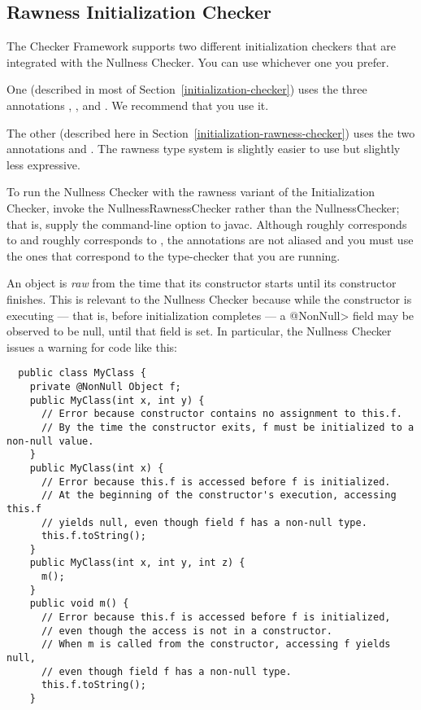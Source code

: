 \subsection{Rawness Initialization Checker\label{initialization-rawness-checker}}

The Checker Framework supports two different initialization checkers that
are integrated with the Nullness Checker.
You can use whichever one you prefer.

One (described in most of Section~\ref{initialization-checker}) uses the three annotations 
,
, and
.
We recommend that you use it.

The other (described here in Section~\ref{initialization-rawness-checker})
uses the two annotations
 and
.
The rawness type system is slightly easier to use but slightly less
expressive.

To run the Nullness Checker with the rawness variant of the Initialization
Checker, invoke the NullnessRawnessChecker rather than the NullnessChecker;
that is, supply the 
command-line option to javac.
Although  roughly corresponds to 
and  roughly corresponds to , the
annotations are not aliased and you must use the ones that correspond to
the type-checker that you are running.





An object is
\emph{raw} from the time that its constructor starts until its constructor
finishes.  This is relevant to the Nullness Checker because while the
constructor is executing --- that is, before initialization completes ---
a \<@NonNull>
field may be observed to be null, until that field is set.  In
particular, the Nullness Checker issues a warning for code like this:

\begin{Verbatim}
  public class MyClass {
    private @NonNull Object f;
    public MyClass(int x, int y) {
      // Error because constructor contains no assignment to this.f.
      // By the time the constructor exits, f must be initialized to a non-null value.
    }
    public MyClass(int x) {
      // Error because this.f is accessed before f is initialized.
      // At the beginning of the constructor's execution, accessing this.f
      // yields null, even though field f has a non-null type.
      this.f.toString();
    }
    public MyClass(int x, int y, int z) {
      m();
    }
    public void m() {
      // Error because this.f is accessed before f is initialized,
      // even though the access is not in a constructor.
      // When m is called from the constructor, accessing f yields null,
      // even though field f has a non-null type.
      this.f.toString();
    }
\end{Verbatim}

